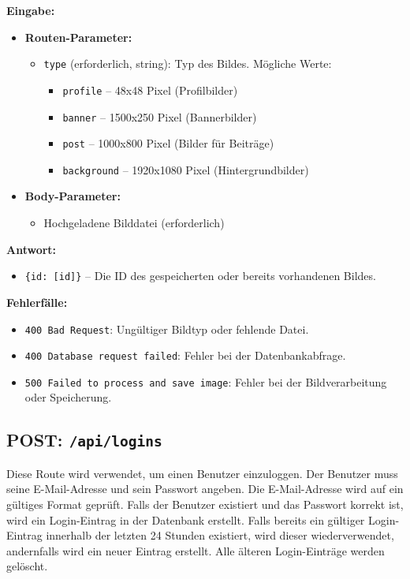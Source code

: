 \documentclass[a4paper,12pt]{article}
\begin{document}
\textbf{Eingabe:}
\begin{itemize}
    \item \textbf{Routen-Parameter:}
    \begin{itemize}
        \item \texttt{type} (erforderlich, string): Typ des Bildes. Mögliche Werte:
        \begin{itemize}
            \item \texttt{profile} – 48x48 Pixel (Profilbilder)
            \item \texttt{banner} – 1500x250 Pixel (Bannerbilder)
            \item \texttt{post} – 1000x800 Pixel (Bilder für Beiträge)
            \item \texttt{background} – 1920x1080 Pixel (Hintergrundbilder)
        \end{itemize}
    \end{itemize}
    \item \textbf{Body-Parameter:}
    \begin{itemize}
        \item Hochgeladene Bilddatei (erforderlich)
    \end{itemize}
\end{itemize}

\textbf{Antwort:}
\begin{itemize}
    \item \texttt{\{id: [id]\}} –
        Die ID des gespeicherten oder bereits vorhandenen Bildes.
\end{itemize}

\textbf{Fehlerfälle:}
\begin{itemize}
    \item \texttt{400 Bad Request}:
        Ungültiger Bildtyp oder fehlende Datei.
    \item \texttt{400 Database request failed}:
        Fehler bei der Datenbankabfrage.
    \item \texttt{500 Failed to process and save image}:
        Fehler bei der Bildverarbeitung oder Speicherung.
\end{itemize}

\newpage
\subsection{POST: \texttt{/api/logins}}

Diese Route wird verwendet, um einen Benutzer einzuloggen. Der Benutzer muss
seine E-Mail-Adresse und sein Passwort angeben. Die E-Mail-Adresse wird auf ein
gültiges Format geprüft. Falls der Benutzer existiert und das Passwort korrekt
ist, wird ein Login-Eintrag in der Datenbank erstellt. Falls bereits ein
gültiger Login-Eintrag innerhalb der letzten 24 Stunden existiert, wird dieser
wiederverwendet, andernfalls wird ein neuer Eintrag erstellt. Alle älteren
Login-Einträge werden gelöscht.
\end{document}
